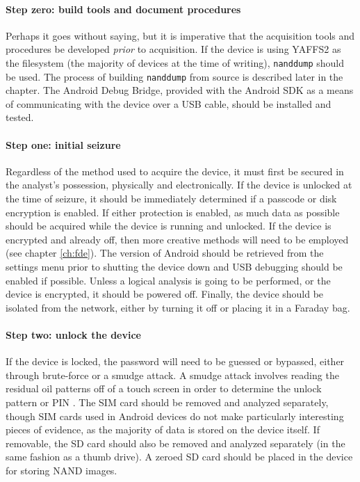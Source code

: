\paragraph{Step zero: build tools and document procedures}
Perhaps it goes without saying, but it is imperative that the acquisition tools and procedures be developed \emph{prior} to
acquisition.  If the device is using YAFFS2 as the filesystem (the majority of devices at the time of writing), \texttt{nanddump}
should  be used.  The process of building \texttt{nanddump} from source is described later in the chapter.  The Android Debug
Bridge, provided with the Android SDK as a means of communicating with the device over a USB cable, should be installed and tested. 

\paragraph{Step one: initial seizure}
Regardless of the method used to acquire the device, it must first be secured in the analyst's possession, physically and
electronically.  If the device is unlocked at the time of seizure, it should be immediately determined if a passcode or disk
encryption is enabled. If either protection is enabled, as much data as possible should be acquired while the device is running and
unlocked.  If the device is encrypted and already off, then more creative methods will need to be employed (see chapter
\ref{ch:fde}).  The version of Android should be retrieved from the settings menu prior to shutting the device down and USB
debugging should be enabled if possible.  Unless a logical analysis is going to be performed, or the device is encrypted, it should
be powered off.  Finally, the device should be isolated from the network, either by turning it off or placing it in a Faraday bag.

\paragraph{Step two: unlock the device}
If the device is locked, the password will need to be guessed or bypassed, either through brute-force or a smudge attack.  A smudge
attack involves reading the residual oil patterns off of a touch screen in order to determine the unlock pattern or PIN
\cite{smudge}. The SIM card should be removed and analyzed separately, though SIM cards used in Android devices do not make
particularly interesting pieces of evidence, as the majority of data is stored on the device itself.  If removable, the SD card
should also be removed and analyzed separately (in the same fashion as a thumb drive). A zeroed SD card should be placed in the
device for storing NAND images. 
 
